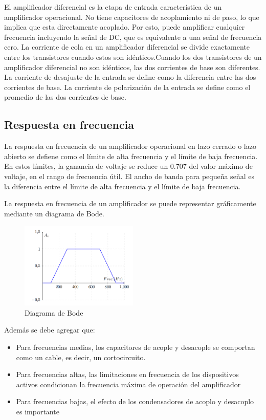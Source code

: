 El amplificador diferencial es la etapa de entrada característica de un amplificador operacional. No tiene capacitores de acoplamiento ni de paso, lo que implica que esta directamente
acoplado. Por esto, puede amplificar cualquier frecuencia incluyendo la señal de DC, que es
equivalente a una señal de frecuencia cero. La corriente de cola en un amplificador diferencial se divide exactamente entre los transistores cuando estos son idénticos.Cuando los dos
transistores de un amplificador diferencial no son idénticos, las dos corrientes de base son
diferentes. La corriente de desajuste de la entrada se define como la diferencia entre las dos
corrientes de base. La corriente de polarización de la entrada se define como el promedio de
las dos corrientes de base.

\subsection{Respuesta en frecuencia}

La respuesta en frecuencia de un amplificador operacional en lazo cerrado o lazo abierto
se defiene como el límite de alta frecuencia y el límite de baja frecuencia. En estos límites, la
ganancia de voltaje se reduce un 0.707 del valor máximo de voltaje, en el rango de frecuencia
útil.
El ancho de banda para pequeña señal es la diferencia entre el límite de alta frecuencia
y el límite de baja frecuencia.

La respuesta en frecuencia de un amplificador se puede representar gráficamente mediante un diagrama de Bode.

\begin{figure}[ht]
    \centering
    \includegraphics[width=0.5\textwidth]{src/images/marco-teorico/diagrama-de-bode.png}
    \caption{Diagrama de Bode}
    \label{fig:mt-diagrama-de-bode}
\end{figure}

Además se debe agregar que:

\begin{itemize}
    \item Para frecuencias medias, los capacitores de acople y desacople se comportan como un
cable, es decir, un cortocircuito.
    \item Para frecuencias altas, las limitaciones en frecuencia de los dispositivos activos condicionan la frecuencia máxima de operación del amplificador
    \item Para frecuencias bajas, el efecto de los condensadores de acoplo y desacoplo es importante
\end{itemize}

